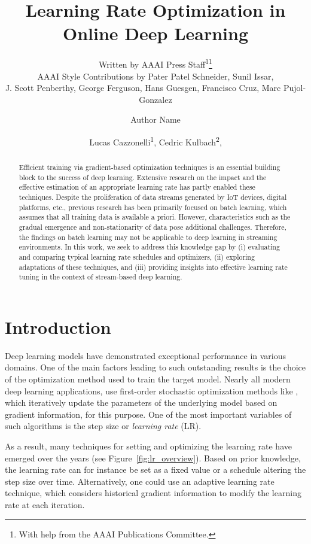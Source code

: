 \documentclass[letterpaper]{article} %
\author{
    Written by AAAI Press Staff\textsuperscript{\rm 1}\thanks{With help from the AAAI Publications Committee.}\\
    AAAI Style Contributions by Pater Patel Schneider,
    Sunil Issar,\\
    J. Scott Penberthy,
    George Ferguson,
    Hans Guesgen,
    Francisco Cruz\equalcontrib,
    Marc Pujol-Gonzalez\equalcontrib}
\author{
    Author Name
}
\title{Learning Rate Optimization in Online Deep Learning}
\author{
    Lucas Cazzonelli\textsuperscript{\rm 1},
    Cedric Kulbach\textsuperscript{\rm 2},
}
\begin{document}
\maketitle


\begin{abstract}
	\noindent Efficient training via gradient-based optimization techniques is an essential building block to the success of deep learning. Extensive research on the impact and the effective estimation of an appropriate learning rate has partly enabled these techniques. Despite the proliferation of data streams generated by IoT devices, digital platforms, etc., previous research has been primarily focused on batch learning, which assumes that all training data is available a priori. However, characteristics such as the gradual emergence and non-stationarity of data pose additional challenges. Therefore, the findings on batch learning may not be applicable to deep learning in streaming environments. In this work, we seek to address this knowledge gap by (i) evaluating and comparing typical learning rate schedules and optimizers, (ii) exploring adaptations of these techniques, and (iii) providing insights into effective learning rate tuning in the context of stream-based deep learning.
\end{abstract}

\section{Introduction}
Deep learning models have demonstrated exceptional performance in various domains.
One of the main factors leading to such outstanding results is the choice of the optimization method used to train the target model.
Nearly all modern deep learning applications, use first-order stochastic optimization methods like , which iteratively update the parameters of the underlying model based on gradient information, for this purpose.
One of the most important variables of such algorithms is the step size or \textit{learning rate} (LR).

As a result, many techniques for setting and optimizing the learning rate have emerged over the years (see Figure~\ref{fig:lr_overview}).
Based on prior knowledge, the learning rate can for instance be set as a fixed value or a schedule altering the step size over time.
Alternatively, one could use an adaptive learning rate technique, which considers historical gradient information to modify the learning rate at each iteration.
\end{document}

